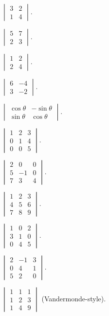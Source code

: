 \begin{problems}
  \item $\begin{vmatrix} 3 & 2 \\ 1 & 4 \end{vmatrix}$.
  \item $\begin{vmatrix} 5 & 7 \\ 2 & 3 \end{vmatrix}$.
  \item $\begin{vmatrix} 1 & 2 \\ 2 & 4 \end{vmatrix}$.
  \item $\begin{vmatrix} 6 & -4 \\ 3 & -2 \end{vmatrix}$.
  \item $\begin{vmatrix} \cos \theta & -\sin \theta \\ \sin \theta & \cos \theta \end{vmatrix}$.
  \item $\begin{vmatrix} 1 & 2 & 3 \\ 0 & 1 & 4 \\ 0 & 0 & 5 \end{vmatrix}$.
  \item $\begin{vmatrix} 2 & 0 & 0 \\ 5 & -1 & 0 \\ 7 & 3 & 4 \end{vmatrix}$.
  \item $\begin{vmatrix} 1 & 2 & 3 \\ 4 & 5 & 6 \\ 7 & 8 & 9 \end{vmatrix}$.
  \item $\begin{vmatrix} 1 & 0 & 2 \\ 3 & 1 & 0 \\ 0 & 4 & 5 \end{vmatrix}$.
  \item $\begin{vmatrix} 2 & -1 & 3 \\ 0 & 4 & 1 \\ 5 & 2 & 0 \end{vmatrix}$.
  \item $\begin{vmatrix} 1 & 1 & 1 \\ 1 & 2 & 3 \\ 1 & 4 & 9 \end{vmatrix}$ (Vandermonde-style).

\end{problems}
